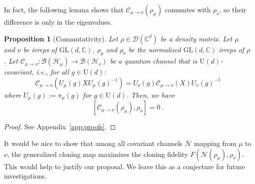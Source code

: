 \documentclass[a4paper,onecolumn,11pt]{quantumarticle}
\newtheorem{prop}{Proposition}
\def\h{\mathcal{H}}
\def\C{\mathcal{C}}
\begin{document}
In fact, the following lemma shows that $\C_{\mu\to\nu}(\rho_\mu)$ commutes with $\rho_\nu$, so their difference is only in the eigenvalues.
\begin{prop}[Commutativity]\label{prop:commutativity}
    Let $\rho \in \mathcal{D}(\mathbb{C}^d)$ be a density matrix. Let $\mu$ and $\nu$ be irreps of $\mathrm{GL}(d,\mathbb C)$, $ \rho_\mu$ and $ \rho_\nu$ be the normalized $\mathrm{GL}(d,\mathbb C)$ irreps of $\rho$.
    Let $\C_{\mu \to \nu}: \mathcal{B}(\h_\mu) \to \mathcal{B}(\h_\nu)$ be a quantum channel that is $\mathrm{U}(d)$-covariant, i.e., for all $g \in \mathrm{U}(d)$:
    \begin{equation}
        \C_{\mu \to \nu}( U_\mu(g) X U_\mu(g)^{-1} ) = U_\nu(g) \C_{\mu \to \nu}(X) U_\nu(g)^{-1}
    \end{equation}
    where $U_\mu(g) := \pi_\mu(g)$ for $g \in \mathrm{U}(d)$.
    Then, we have
    \begin{equation}
        \left[ \C_{\mu \to \nu}(\rho_\mu), \rho_\nu \right] = 0 \ .
    \end{equation}
\end{prop}
\begin{proof}See Appendix~\ref{app:proofs}.\end{proof}

It would be nice to show that among all covariant channels $\mathcal{N}$ mapping from $\mu$ to $\nu$, the generalized cloning map maximizes the cloning fidelity $F(\mathcal{N}(\rho_\mu), \rho_\nu)$. This would help to justify our proposal. We leave this as a conjecture for future investigations. 
\end{document}
